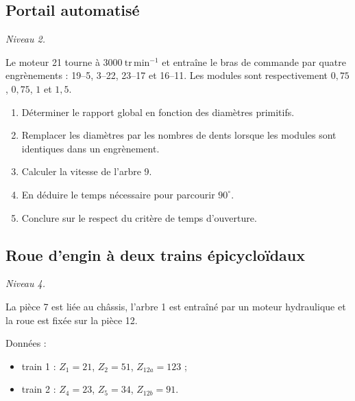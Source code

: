\subsection{Portail automatisé}

\textit{Niveau 2.}

Le moteur 21 tourne à $3000\ \mathrm{tr\,min^{-1}}$ et entraîne le bras
de commande par quatre engrènements : 19--5, 3--22, 23--17 et 16--11.
Les modules sont respectivement $0{,}75$, $0{,}75$, $1$ et $1{,}5$.

\begin{center}
\hfill
{}\hfill
{}
\end{center}

\begin{enumerate}
  \item Déterminer le rapport global en fonction des diamètres primitifs.
  \item Remplacer les diamètres par les nombres de dents lorsque les modules sont identiques dans un engrènement.
  \item Calculer la vitesse de l'arbre 9.
  \item En déduire le temps nécessaire pour parcourir $90^\circ$.
  \item Conclure sur le respect du critère de temps d'ouverture.
\end{enumerate}

\subsection{Roue d'engin à deux trains épicycloïdaux}

\textit{Niveau 4.}

La pièce 7 est liée au châssis, l'arbre 1 est entraîné par un moteur
hydraulique et la roue est fixée sur la pièce 12.

\begin{center}
\hfill
{}
\end{center}

Données :
\begin{itemize}
  \item train 1 : $Z_1=21$, $Z_2=51$, $Z_{12a}=123$ ;
  \item train 2 : $Z_4=23$, $Z_5=34$, $Z_{12b}=91$.
\end{itemize}

